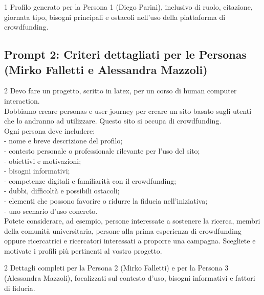 \documentclass[11pt,a4paper]{article}
\begin{document}
    \begin{respbox}{1}
        Profilo generato per la Persona 1 (Diego Parini), inclusivo di ruolo, citazione, giornata tipo, bisogni principali e ostacoli nell'uso della piattaforma di crowdfunding.
    \end{respbox}

    \subsection{Prompt 2: Criteri dettagliati per le Personas (Mirko Falletti e Alessandra Mazzoli)}
    \label{prompt:2}
    \begin{promptbox}{2}
        Devo fare un progetto, scritto in latex, per un corso di human computer interaction.\\
        Dobbiamo creare personas e user journey per creare un sito basato sugli utenti che lo andranno ad utilizzare. Questo sito si occupa di crowdfunding.\\
        Ogni persona deve includere:\\
        - nome e breve descrizione del profilo;\\
        - contesto personale o professionale rilevante per l’uso del sito;\\
        - obiettivi e motivazioni;\\
        - bisogni informativi;\\
        - competenze digitali e familiarità con il crowdfunding;\\
        - dubbi, difficoltà e possibili ostacoli;\\
        - elementi che possono favorire o ridurre la fiducia nell’iniziativa;\\
        - uno scenario d’uso concreto.\\
        Potete considerare, ad esempio, persone interessate a sostenere la ricerca, membri della comunità universitaria, persone alla prima esperienza di crowdfunding oppure ricercatrici e ricercatori interessati a proporre una campagna. Scegliete e motivate i profili più pertinenti al vostro progetto.
    \end{promptbox}

    \begin{respbox}{2}
        Dettagli completi per la Persona 2 (Mirko Falletti) e per la Persona 3 (Alessandra Mazzoli), focalizzati sul contesto d'uso, bisogni informativi e fattori di fiducia.
    \end{respbox}
\end{document}
